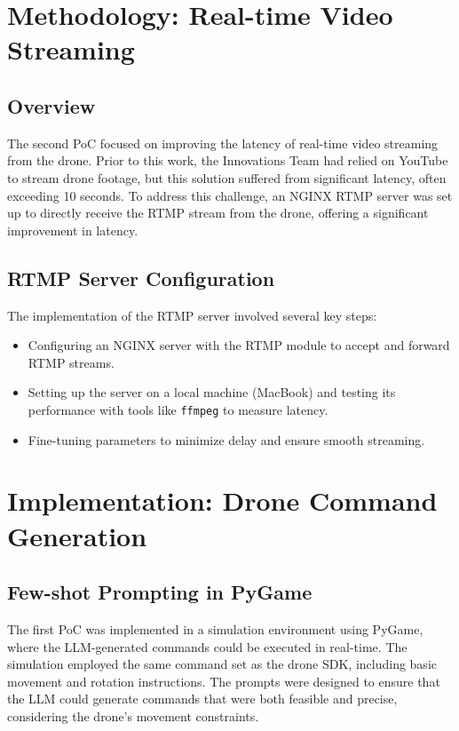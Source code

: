 \section{Methodology: Real-time Video Streaming}
\subsection{Overview}
The second \ac{PoC} focused on improving the latency of real-time video streaming from the drone. 
Prior to this work, the Innovations Team had relied on YouTube to stream drone footage, but this solution suffered from significant latency, often exceeding 10 seconds. 
To address this challenge, an NGINX \ac{RTMP} server was set up to directly receive the \ac{RTMP} stream from the drone, offering a significant improvement in latency.

\subsection{RTMP Server Configuration}
The implementation of the \ac{RTMP} server involved several key steps:
\begin{itemize}
    \item Configuring an NGINX server with the \ac{RTMP} module to accept and forward \ac{RTMP} streams.
    \item Setting up the server on a local machine (MacBook) and testing its performance with tools like \texttt{ffmpeg} to measure latency.
    \item Fine-tuning parameters to minimize delay and ensure smooth streaming.
\end{itemize}

\section{Implementation: Drone Command Generation}
\subsection{Few-shot Prompting in PyGame}
The first \ac{PoC} was implemented in a simulation environment using PyGame, where the \ac{LLM}-generated commands could be executed in real-time. 
The simulation employed the same command set as the drone \ac{SDK}, including basic movement and rotation instructions. 
The prompts were designed to ensure that the \ac{LLM} could generate commands that were both feasible and precise, considering the drone's movement constraints.

